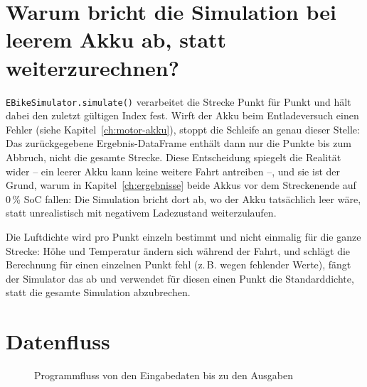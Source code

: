 \section{Warum bricht die Simulation bei leerem Akku ab, statt weiterzurechnen?}

\texttt{EBikeSimulator.simulate()} verarbeitet die Strecke Punkt für Punkt und hält dabei den zuletzt gültigen Index fest. Wirft der Akku beim Entladeversuch einen Fehler (siehe Kapitel~\ref{ch:motor-akku}), stoppt die Schleife an genau dieser Stelle: Das zurückgegebene Ergebnis-DataFrame enthält dann nur die Punkte bis zum Abbruch, nicht die gesamte Strecke. Diese Entscheidung spiegelt die Realität wider -- ein leerer Akku kann keine weitere Fahrt antreiben --, und sie ist der Grund, warum in Kapitel~\ref{ch:ergebnisse} beide Akkus vor dem Streckenende auf 0\,\% SoC fallen: Die Simulation bricht dort ab, wo der Akku tatsächlich leer wäre, statt unrealistisch mit negativem Ladezustand weiterzulaufen.

Die Luftdichte wird pro Punkt einzeln bestimmt und nicht einmalig für die ganze Strecke: Höhe und Temperatur ändern sich während der Fahrt, und schlägt die Berechnung für einen einzelnen Punkt fehl (z.\,B. wegen fehlender Werte), fängt der Simulator das ab und verwendet für diesen einen Punkt die Standarddichte, statt die gesamte Simulation abzubrechen.

\section{Datenfluss}

\begin{figure}[htbp]
\centering
{}
\caption{Programmfluss von den Eingabedaten bis zu den Ausgaben}
\label{fig:datenfluss}
\end{figure}

